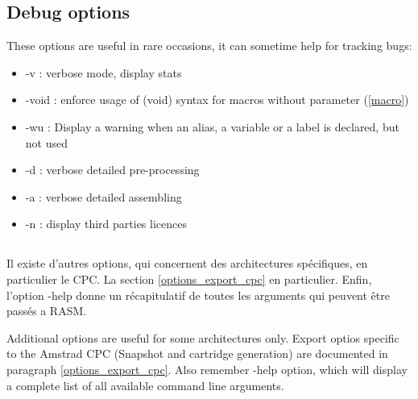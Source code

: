 \begin{xen}
\subsection{Debug options}
These options are useful in rare occasions, it can sometime help for tracking bugs:
\begin{itemize}
\item -v : verbose mode, display stats
\item -void : enforce usage of (void) syntax for macros without parameter (\ref{macro})
\item -wu : Display a warning when an alias, a variable or a label is declared, but not used
\item -d : verbose detailed pre-processing
\item -a : verbose detailed assembling
\item -n : display third parties licences
\end{itemize}

\end{xen}





\subsection{}

\begin{xfr}
  Il existe d'autres options, qui concernent des architectures spécifiques, en particulier le CPC. La section \ref{options_export_cpc} en particulier.
  Enfin, l'option -help donne un récapitulatif de toutes les arguments qui peuvent être passés a RASM.
\end{xfr}

\begin{xen}
  Additional options are useful for some architectures only. Export optios specific to the Amstrad CPC (Snapshot and cartridge generation) are documented in paragraph \ref{options_export_cpc}.
  Also remember -help option, which will display a complete list of all available command line arguments.
\end{xen}
